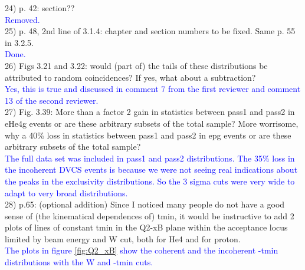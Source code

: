 24) p. 42: section?? \\
\textcolor{blue}{ Removed.}\\
 
25) p. 48, 2nd line of 3.1.4: chapter and section numbers to be fixed. Same p. 55 
in 3.2.5. \\
\textcolor{blue}{Done.}\\

26) Figs 3.21 and 3.22: would (part of) the tails of these distributions be 
attributed to random coincidences? If yes, what about a subtraction? \\
\textcolor{blue}{Yes, this is true and discussed in 
comment 7 from the first reviewer and comment 13 of the second reviewer.}\\

27) Fig. 3.39: More than a factor 2 gain in statistics between pass1 and pass2 in 
eHe4g events or are these arbitrary subsets of the total sample? More 
worrisome, why a 40$\%$ loss in statistics between pass1 and pass2 in epg 
events or are these arbitrary subsets of the total sample?\\
\textcolor{blue}{
The full data set was included in pass1 and pass2 distributions. The 35$\%$ 
loss in the incoherent DVCS events is because we were not seeing real 
indications about the peaks in the exclusivity distributions. So the 3 sigma 
cuts were very wide to adapt to very broad distributions. }\\

28) p.65: (optional addition) Since I noticed many people do not have a good 
sense of (the kinematical dependences of) tmin, it would be instructive to add 
2 plots of lines of constant tmin in the Q2-xB plane within the acceptance 
locus limited by beam energy and W cut, both for He4 and for proton.\\
\textcolor{blue}{
   The plots in figure \ref{fig:Q2_xB} show the coherent and the incoherent 
-tmin distributions with the W and -tmin cuts. }\\ 

